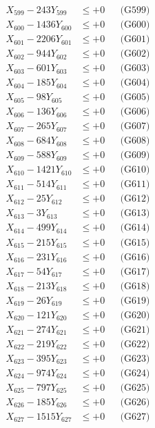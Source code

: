 \documentclass[a4paper,10pt]{article}
\begin{document}
{\begin{align}
X_{599} - 243Y_{599} &\leq +0 && \text{(G599)} \\
X_{600} - 1436Y_{600} &\leq +0 && \text{(G600)} \\
\allowbreak
X_{601} - 2206Y_{601} &\leq +0 && \text{(G601)} \\
X_{602} - 944Y_{602} &\leq +0 && \text{(G602)} \\
X_{603} - 601Y_{603} &\leq +0 && \text{(G603)} \\
X_{604} - 185Y_{604} &\leq +0 && \text{(G604)} \\
X_{605} - 98Y_{605} &\leq +0 && \text{(G605)} \\
X_{606} - 136Y_{606} &\leq +0 && \text{(G606)} \\
X_{607} - 265Y_{607} &\leq +0 && \text{(G607)} \\
X_{608} - 684Y_{608} &\leq +0 && \text{(G608)} \\
X_{609} - 588Y_{609} &\leq +0 && \text{(G609)} \\
X_{610} - 1421Y_{610} &\leq +0 && \text{(G610)} \\
\allowbreak
X_{611} - 514Y_{611} &\leq +0 && \text{(G611)} \\
X_{612} - 25Y_{612} &\leq +0 && \text{(G612)} \\
X_{613} - 3Y_{613} &\leq +0 && \text{(G613)} \\
X_{614} - 499Y_{614} &\leq +0 && \text{(G614)} \\
X_{615} - 215Y_{615} &\leq +0 && \text{(G615)} \\
X_{616} - 231Y_{616} &\leq +0 && \text{(G616)} \\
X_{617} - 54Y_{617} &\leq +0 && \text{(G617)} \\
X_{618} - 213Y_{618} &\leq +0 && \text{(G618)} \\
X_{619} - 26Y_{619} &\leq +0 && \text{(G619)} \\
X_{620} - 121Y_{620} &\leq +0 && \text{(G620)} \\
\allowbreak
X_{621} - 274Y_{621} &\leq +0 && \text{(G621)} \\
X_{622} - 219Y_{622} &\leq +0 && \text{(G622)} \\
X_{623} - 395Y_{623} &\leq +0 && \text{(G623)} \\
X_{624} - 974Y_{624} &\leq +0 && \text{(G624)} \\
X_{625} - 797Y_{625} &\leq +0 && \text{(G625)} \\
X_{626} - 185Y_{626} &\leq +0 && \text{(G626)} \\
X_{627} - 1515Y_{627} &\leq +0 && \text{(G627)} \\

\end{align}}
\end{document}
